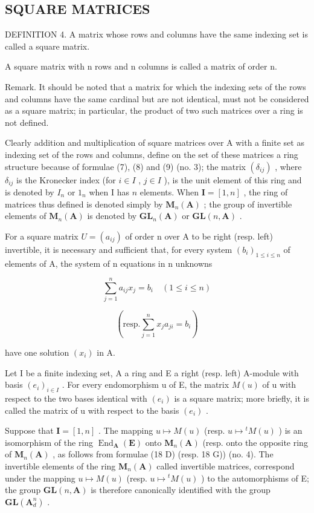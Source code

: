 \subsection{SQUARE MATRICES}

DEFINITION 4. A matrix whose rows and columns have the same indexing set is called a square matrix.

A square matrix with n rows and n columns is called a matrix of order n.

Remark. It should be noted that a matrix for which the indexing sets of the rows and columns have the same cardinal but are not identical, must not be considered as a square matrix; in particular, the product of two such matrices over a ring is not defined.

Clearly addition and multiplication of square matrices over A with a finite set as indexing set of the rows and columns, define on the set of these matrices a ring structure because of formulae (7), (8) and (9) (no. 3); the matrix \((\delta_{ij})\) , where \(\delta_{ij}\) is the Kronecker index (for \(i \in I\) , \(j \in I\) ), is the unit element of this ring and is denoted by \(I_n\) or \(1_n\) when I has \(n\) elements. When \(\mathbf{I} = [1, n]\) , the ring of matrices thus defined is denoted simply by \(\mathbf{M}_n(\mathbf{A})\) ; the group of invertible elements of \(\mathbf{M}_n(\mathbf{A})\) is denoted by \(\mathbf{GL}_n(\mathbf{A})\) or \(\mathbf{GL}(n, \mathbf{A})\) .

For a square matrix \(U = (a_{ij})\) of order n over A to be right (resp. left) invertible, it is necessary and sufficient that, for every system \((b_i)_{1 \leq i \leq n}\) of elements of A, the system of n equations in n unknowns

\[
\sum_ {j = 1} ^ {n} a _ {i j} x _ {j} = b _ {i} \quad (1 \leqslant i \leqslant n)
\]

\[
\left(\text {resp.} \sum_ {j = 1} ^ {n} x _ {j} a _ {j i} = b _ {i}\right)
\]

have one solution \((x_{i})\) in A.

Let I be a finite indexing set, A a ring and E a right (resp. left) A-module with basis \((e_{i})_{i\in I}\) . For every endomorphism u of E, the matrix \(M(u)\) of u with respect to the two bases identical with \((e_{i})\) is a square matrix; more briefly, it is called the matrix of u with respect to the basis \((e_{i})\) .

Suppose that \(\mathbf{I} = [1, n]\) . The mapping \(u \mapsto M(u)\) (resp. \(u \mapsto {}^t M(u)\) ) is an isomorphism of the ring \(\operatorname{End}_{\mathbf{A}}(\mathbf{E})\) onto \(\mathbf{M}_n(\mathbf{A})\) (resp. onto the opposite ring of \(\mathbf{M}_n(\mathbf{A})\) , as follows from formulae (18 D) (resp. 18 G)) (no. 4). The invertible elements of the ring \(\mathbf{M}_{n}(\mathbf{A})\) called invertible matrices, correspond under the mapping \(u \mapsto M(u)\) (resp. \(u \mapsto {}^{t}M(u)\) ) to the automorphisms of E; the group \(\mathbf{GL}(n, \mathbf{A})\) is therefore canonically identified with the group \(\mathbf{GL}(\mathbf{A}_{d}^{n})\) .

